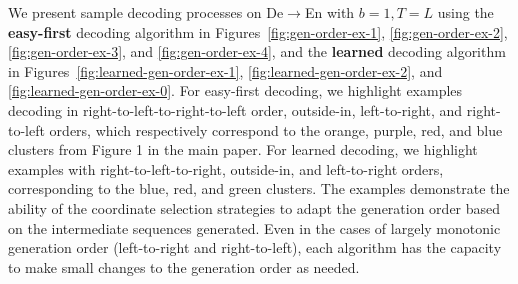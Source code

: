 \documentclass{article}
\begin{document}
We present sample decoding processes on De$\rightarrow$En with $b=1, T=L$ using the \textbf{easy-first} decoding algorithm in Figures~\ref{fig:gen-order-ex-1}, \ref{fig:gen-order-ex-2}, \ref{fig:gen-order-ex-3}, and \ref{fig:gen-order-ex-4}, and the \textbf{learned} decoding algorithm in Figures~\ref{fig:learned-gen-order-ex-1}, \ref{fig:learned-gen-order-ex-2}, and \ref{fig:learned-gen-order-ex-0}.
For easy-first decoding, we highlight examples decoding in right-to-left-to-right-to-left order, outside-in, left-to-right, and right-to-left orders, which respectively correspond to the {\color{orange} orange}, {\color{purple} purple}, {\color{red} red}, and {\color{blue} blue} clusters from Figure 1 in the main paper. 
For learned decoding, we highlight examples with right-to-left-to-right, outside-in, and left-to-right orders, corresponding to the {\color{blue} blue}, {\color{red} red}, and {\color{green} green} clusters.
The examples demonstrate the ability of the coordinate selection strategies to adapt the generation order based on the intermediate sequences generated. Even in the cases of largely monotonic generation order (left-to-right and right-to-left), each algorithm has the capacity to make small changes to the generation order as needed.

\begin{table*}[t!]
    \centering
    
    \label{tab:constant_time_comparison}
\end{table*}

\begin{figure*}[t!]
    \centering
    
    \label{fig:ef-lr-energy}
\end{figure*}

\begin{figure*}[t!]
    \centering
    
    \label{fig:ef-lr-energy2}
\end{figure*}


\begin{figure*}[t!]
    \centering
    
    \label{fig:gen-order-ex-1}
\end{figure*}

\begin{figure*}[t!]
    \centering
    
    \label{fig:gen-order-ex-2}
\end{figure*}

\begin{figure*}[t!]
    \centering
    
    \label{fig:gen-order-ex-3}
\end{figure*}
\end{document}
